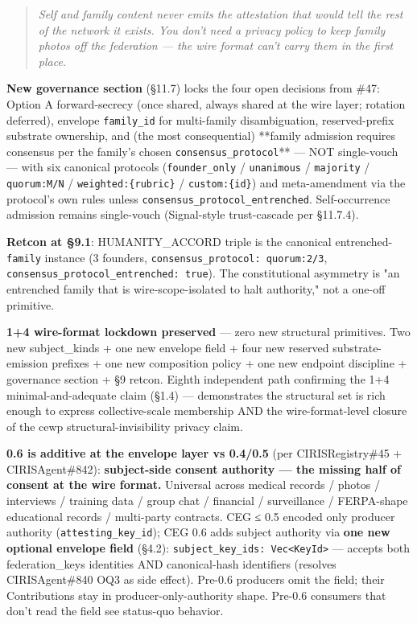 \documentclass[10pt]{article}
\begin{document}
\begin{quote}\itshape Self and family content never emits the attestation that would tell the rest of the network it exists. You don't need a privacy policy to keep family photos off the federation — the wire format can't carry them in the first place.\end{quote}


\textbf{New governance section} (§11.7) locks the four open decisions from \#47: Option A forward-secrecy (once shared, always shared at the wire layer; rotation deferred), envelope \texttt{family\_id} for multi-family disambiguation, reserved-prefix substrate ownership, and (the most consequential) **family admission requires consensus per the family's chosen \texttt{consensus\_protocol}** — NOT single-vouch — with six canonical protocols (\texttt{founder\_only} / \texttt{unanimous} / \texttt{majority} / \texttt{quorum:M/N} / \texttt{weighted:\{rubric\}} / \texttt{custom:\{id\}}) and meta-amendment via the protocol's own rules unless \texttt{consensus\_protocol\_entrenched}. Self-occurrence admission remains single-vouch (Signal-style trust-cascade per §11.7.4).


\textbf{Retcon at §9.1}: HUMANITY\_ACCORD triple is the canonical entrenched-\texttt{family} instance (3 founders, \texttt{consensus\_protocol: quorum:2/3}, \texttt{consensus\_protocol\_entrenched: true}). The constitutional asymmetry is "an entrenched family that is wire-scope-isolated to halt authority," not a one-off primitive.


\textbf{1+4 wire-format lockdown preserved} — zero new structural primitives. Two new subject\_kinds + one new envelope field + four new reserved substrate-emission prefixes + one new composition policy + one new endpoint discipline + governance section + §9 retcon. Eighth independent path confirming the 1+4 minimal-and-adequate claim (§1.4) — demonstrates the structural set is rich enough to express collective-scale membership AND the wire-format-level closure of the cewp structural-invisibility privacy claim.


\textbf{0.6 is additive at the envelope layer vs 0.4/0.5} (per CIRISRegistry\#45 + CIRISAgent\#842): \textbf{subject-side consent authority — the missing half of consent at the wire format.} Universal across medical records / photos / interviews / training data / group chat / financial / surveillance / FERPA-shape educational records / multi-party contracts. CEG ≤ 0.5 encoded only producer authority (\texttt{attesting\_key\_id}); CEG 0.6 adds subject authority via \textbf{one new optional envelope field} (§4.2): \texttt{subject\_key\_ids: Vec<KeyId>} — accepts both federation\_keys identities AND canonical-hash identifiers (resolves CIRISAgent\#840 OQ3 as side effect). Pre-0.6 producers omit the field; their Contributions stay in producer-only-authority shape. Pre-0.6 consumers that don't read the field see status-quo behavior.
\end{document}
